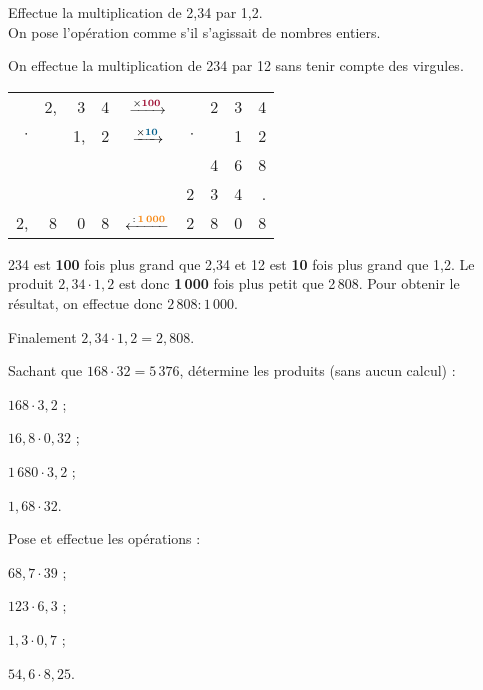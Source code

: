 \begin{methode*1}

\begin{exemple*1}

Effectue la multiplication de 2,34 par 1,2.\\[1em]

On pose l'opération comme s'il s'agissait de nombres entiers. 

On effectue la multiplication de 234 par 12 sans tenir compte des virgules.

\begin{minipage}{.6\linewidth}
\begin{tabular}{rrrrcrrrr}
& 2, & 3 & 4 & $\xrightarrow{\times \text{\textcolor{B1}{\textbf{100}}}}$ & & 2 & 3 & 4 \\
$\cdot$ & & 1, & 2 & $\xrightarrow{\times \text{\textcolor{A1}{\textbf{10}}}}$ & $\cdot$ & & 1 & 2 \\ \cline{1-4} \cline{6-9}
& & & & & & 4 & 6 & 8 \\
& & & & & 2 & 3 & 4 & . \\ \cline{1-4} \cline{6-9}
2, & 8 & 0 & 8 & $\xleftarrow{\,:\,\text{\textcolor{J1}{\textbf{1\,000}}}}$ & 2 & 8 & 0 & 8 \\
\end{tabular}
\end{minipage}\hfill%
%
\begin{minipage}{.37\linewidth}
234 est \textcolor{B1}{\textbf{100}} fois plus grand que 2,34 et 12 est \textcolor{A1}{\textbf{10}} fois plus grand que 1,2. Le produit $2,34 \cdot 1,2$ est donc \textcolor{J1}{\textbf{1\,000}} fois plus petit que 2\,808. Pour obtenir le résultat, on effectue donc $2\,808 : 1\,000$.\\[0.75em]
\end{minipage}
Finalement $2,34 \cdot 1,2 = 2,808$.
\end{exemple*1}

\exercice

Sachant que $168 \cdot 32 = 5\,376$, détermine les produits (sans aucun calcul) :
\begin{colenumerate}{4}
 \item $168 \cdot 3,2$ ;
 \item $16,8 \cdot 0,32$ ;
 \item $1\,680 \cdot 3,2$ ;
 \item $1,68 \cdot 32$.
\end{colenumerate}

Pose et effectue les opérations :
\begin{colenumerate}{4}
 \item $68,7 \cdot 39$ ;
 \item $123 \cdot 6,3$ ;
 \item $1,3 \cdot 0,7$ ;
 \item $54,6 \cdot 8,25$.
\end{colenumerate}

\end{methode*1}


